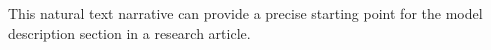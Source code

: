 \documentclass[10pt,letterpaper,table]{article}
\begin{document}

This natural text narrative can provide a precise starting point for the model description section in a research article.
\end{document}
